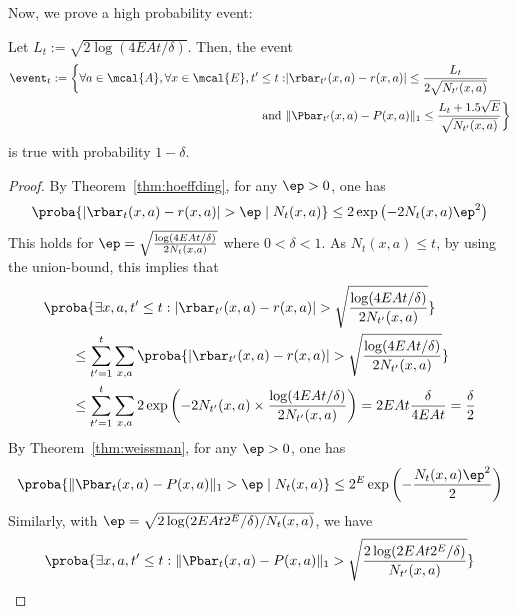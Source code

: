             Now, we prove a high probability event:
            \begin{lem}
            \label{lem:high_prob_event}
                Let $L_t:=\sqrt{2\log(4EAt/\delta)}$. Then, the event
                \begin{align}
                \event_t:=\bigg\{\forall a\in\mcal{A}, \forall x\in\mcal{E}, t'\le t: &\vert\rbar_{t'}(x,a)-r(x,a)\vert\le \frac{L_t}{2\sqrt{N_{t'}(x,a)}}\\
                \text{ and } &\Vert\Pbar_{t'}(x,a)-P(x,a)\Vert_1\le \frac{L_t+1.5\sqrt{E}}{\sqrt{N_{t'}(x,a)}}\bigg\}
                \end{align}
                is true with probability $1-\delta$.
            \end{lem}
            \begin{proof}
                By Theorem~\ref{thm:hoeffding}, for any $\ep>0$, one has
                \begin{align*}
                \proba{\vert\rbar_{t}(x,a)-r(x,a)\vert>\ep \mid N_{t}(x,a)} \le 2\exp\left(-2N_{t}(x,a)\ep^2\right)
                \end{align*}
                This holds for $\ep=\sqrt{\frac{\log(4EAt/\delta)}{2N_t(x,a)}}$ where $0<\delta<1$.
                As $N_t(x,a)\le t$, by using the union-bound, this implies that
                \begin{align}
                &\proba{\exists x,a, t'\le t: \vert\rbar_{t'}(x,a)-r(x,a)\vert>\sqrt{\frac{\log(4EAt/\delta)}{2N_{t'}(x,a)}}} \label{eq:conc_r}\\
                &\qquad \le \sum_{t'=1}^{t}\sum_{x,a} \proba{\vert\rbar_{t'}(x,a)-r(x,a)\vert>\sqrt{\frac{\log(4EAt/\delta)}{2N_{t'}(x,a)}}} \nonumber \\
                &\qquad \le \sum_{t'=1}^{t}\sum_{x,a} 2\exp\left(-2N_{t'}(x,a)\times\frac{\log(4EAt/\delta)}{2N_{t'}(x,a)}\right) =2EAt \frac{\delta}{4EAt}=\frac{\delta}2 \nonumber
                \end{align}
                By Theorem~\ref{thm:weissman}, for any $\ep>0$, one has
                \begin{align*}
                \proba{\Vert\Pbar_t(x,a)-P(x,a)\Vert_1 > \ep \mid N_t(x,a)} \le 2^E\exp\left(-\frac{N_t(x,a)\ep^2}{2}\right)
                \end{align*}
                Similarly, with $\ep=\sqrt{2\log(2EAt2^E/\delta)/N_t(x,a)}$, we have
                \begin{align*}
                &\proba{\exists x,a, t'\le t: \Vert\Pbar_t(x,a)-P(x,a)\Vert_1 >\sqrt{\frac{2\log(2EAt2^E/\delta)}{N_{t'}(x,a)}}} \\

\end{align*}
\end{proof}
